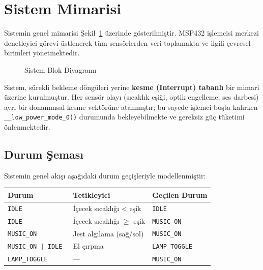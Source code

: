 \documentclass[12pt, a4paper]{article}
\begin{document}
\section{Sistem Mimarisi}

Sistemin genel mimarisi Şekil~\ref{fig:mimari} üzerinde gösterilmiştir. MSP432 işlemcisi
merkezi denetleyici görevi üstlenerek tüm sensörlerden veri toplamakta ve ilgili çevresel
birimleri yönetmektedir.

\begin{figure}[H]
  \centering
  \fbox{\rule{0pt}{5cm}\rule{0.85\textwidth}{0pt}}
  \caption{Sistem Blok Diyagramı}
  \label{fig:mimari}
\end{figure}

Sistem, sürekli bekleme döngüleri yerine \textbf{kesme (Interrupt) tabanlı} bir mimari
üzerine kurulmuştur. Her sensör olayı (sıcaklık eşiği, optik engelleme, ses darbesi)
ayrı bir donanımsal kesme vektörüne atanmıştır; bu sayede işlemci boşta kalırken
\texttt{\_\_low\_power\_mode\_0()} durumunda bekleyebilmekte ve gereksiz güç tüketimi
önlenmektedir.

\subsection{Durum Şeması}

Sistemin genel akışı aşağıdaki durum geçişleriyle modellenmiştir:

\begin{center}
\begin{tabular}{lll}
  \toprule
  \textbf{Durum} & \textbf{Tetikleyici} & \textbf{Geçilen Durum} \\
  \midrule
  \texttt{IDLE}         & İçecek sıcaklığı < eşik           & \texttt{IDLE} \\
  \texttt{IDLE}         & İçecek sıcaklığı $\geq$ eşik      & \texttt{MUSIC\_ON} \\
  \texttt{MUSIC\_ON}    & Jest algılama (sağ/sol)            & \texttt{MUSIC\_ON} \\
  \texttt{MUSIC\_ON | IDLE }    & El çırpma                          & \texttt{LAMP\_TOGGLE} \\
  \texttt{LAMP\_TOGGLE} & —                                  & \texttt{MUSIC\_ON} \\
  \bottomrule
\end{tabular}
\end{center}
\end{document}
